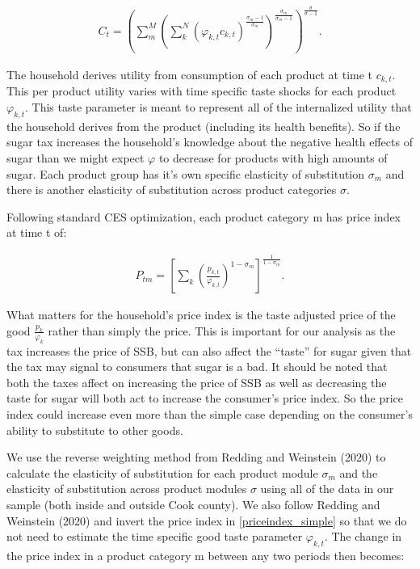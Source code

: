 \documentclass[12pt]{article}
\begin{document}
\begin{align}
	C_t = \left( \sum_m^M \left( \sum_k^N (\varphi_{k,t} c_{k,t})^{\frac{\sigma_m-1}{\sigma_m}}  \right)^{\frac{\sigma_m}{\sigma_m-1}} \right)^{\frac{\sigma}{\sigma-1}}.
\end{align}

The household derives utility from consumption of each product at time t $c_{k,t}$. This per product utility varies with time specific taste shocks for each product $\varphi_{k,t}$. This taste parameter is meant to represent all of the internalized utility that the household derives from the product (including its health benefits). So if the sugar tax increases the household's knowledge about the negative health effects of sugar than we might expect $\varphi$ to decrease for products with high amounts of sugar. Each product group has it's own specific elasticity of substitution $\sigma_m$ and there is another elasticity of substitution across product categories $\sigma$.

Following standard CES optimization, each product category m has price index at time t of:

\begin{align}
    P_{tm} = \left[ \sum_k \left( \frac{p_{k,t}}{\varphi_{k,t}}  \right)^{1-\sigma_m}  \right]^{\frac{1}{1-\sigma_m}}. \label{priceindex_simple}
\end{align}

What matters for the household's price index is the taste adjusted price of the good $\frac{p_k}{\varphi_k}$ rather than simply the price. This is important for our analysis as the tax increases the price of SSB, but can also affect the ``taste'' for sugar given that the tax may signal to consumers that sugar is a bad. It should be noted that both the taxes affect on increasing the price of SSB as well as decreasing the taste for sugar will both act to increase the consumer's price index. So the price index could increase even more than the simple case depending on the consumer's ability to substitute to other goods.

We use the reverse weighting method from Redding and Weinstein (2020) to calculate the elasticity of substitution for each product module $\sigma_m$  and the elasticity of substitution across product modules $\sigma$ using all of the data in our sample (both inside and outside Cook county). We also follow Redding and Weinstein (2020) and invert the price index in \eqref{priceindex_simple} so that we do not need to estimate the time specific good taste parameter $\varphi_{k,t}$. The change in the price index in a product category m between any two periods then becomes:
\end{document}
